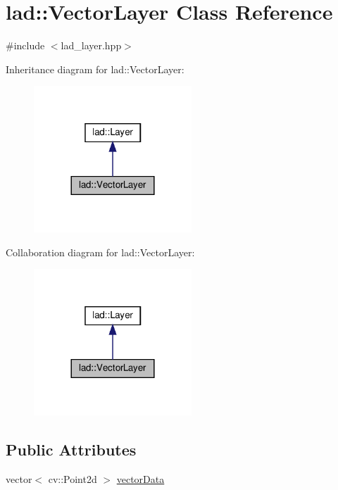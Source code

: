 \hypertarget{classlad_1_1_vector_layer}{}\section{lad\+:\+:Vector\+Layer Class Reference}
\label{classlad_1_1_vector_layer}


{\ttfamily \#include $<$lad\+\_\+layer.\+hpp$>$}



Inheritance diagram for lad\+:\+:Vector\+Layer\+:\nopagebreak
\begin{figure}[H]
\begin{center}
\leavevmode
\includegraphics[width=168pt]{classlad_1_1_vector_layer__inherit__graph}
\end{center}
\end{figure}


Collaboration diagram for lad\+:\+:Vector\+Layer\+:\nopagebreak
\begin{figure}[H]
\begin{center}
\leavevmode
\includegraphics[width=168pt]{classlad_1_1_vector_layer__coll__graph}
\end{center}
\end{figure}
\subsection*{Public Attributes}
\begin{DoxyCompactItemize}
\item 
vector$<$ cv\+::\+Point2d $>$ \hyperlink{classlad_1_1_vector_layer_ac027d923ab9f76e23d4d1253d7611348}{vector\+Data}
\end{DoxyCompactItemize}
